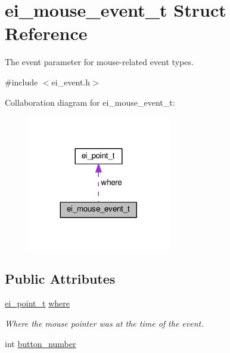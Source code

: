 \hypertarget{structei__mouse__event__t}{}\section{ei\+\_\+mouse\+\_\+event\+\_\+t Struct Reference}
\label{structei__mouse__event__t}


The event parameter for mouse-\/related event types.  




{\ttfamily \#include $<$ei\+\_\+event.\+h$>$}



Collaboration diagram for ei\+\_\+mouse\+\_\+event\+\_\+t\+:
\nopagebreak
\begin{figure}[H]
\begin{center}
\leavevmode
\includegraphics[width=176pt]{structei__mouse__event__t__coll__graph}
\end{center}
\end{figure}
\subsection*{Public Attributes}
\begin{DoxyCompactItemize}
\item 
\mbox{\label{structei__mouse__event__t_ac50f216f7af2a99469bd39cebc309af5}} 
\hyperlink{structei__point__t}{ei\+\_\+point\+\_\+t} \hyperlink{structei__mouse__event__t_ac50f216f7af2a99469bd39cebc309af5}{where}
\begin{DoxyCompactList}\small\item\em Where the mouse pointer was at the time of the event. \end{DoxyCompactList}\item 
int \hyperlink{structei__mouse__event__t_a3165d2e07c861aa9ccb114a10a6b0afb}{button\+\_\+number}
\end{DoxyCompactItemize}


